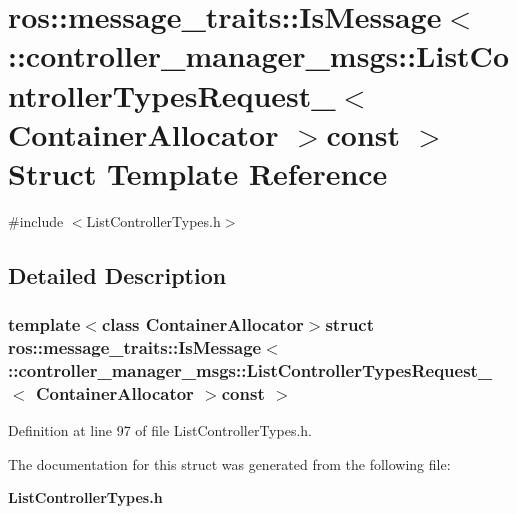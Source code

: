 \section{ros\-:\-:message\-\_\-traits\-:\-:\-Is\-Message$<$ \-:\-:controller\-\_\-manager\-\_\-msgs\-:\-:\-List\-Controller\-Types\-Request\-\_\-$<$ \-Container\-Allocator $>$const $>$ \-Struct \-Template \-Reference}
\label{structros_1_1message__traits_1_1IsMessage_3_01_1_1controller__manager__msgs_1_1ListControllerTyp6d039ab19ef20152a4d882b56584a739}


{\ttfamily \#include $<$\-List\-Controller\-Types.\-h$>$}



\subsection{\-Detailed \-Description}
\subsubsection*{template$<$class Container\-Allocator$>$struct ros\-::message\-\_\-traits\-::\-Is\-Message$<$ \-::controller\-\_\-manager\-\_\-msgs\-::\-List\-Controller\-Types\-Request\-\_\-$<$ Container\-Allocator $>$const  $>$}



\-Definition at line 97 of file \-List\-Controller\-Types.\-h.



\-The documentation for this struct was generated from the following file\-:\begin{DoxyCompactItemize}
\item 
{\bf \-List\-Controller\-Types.\-h}\end{DoxyCompactItemize}
